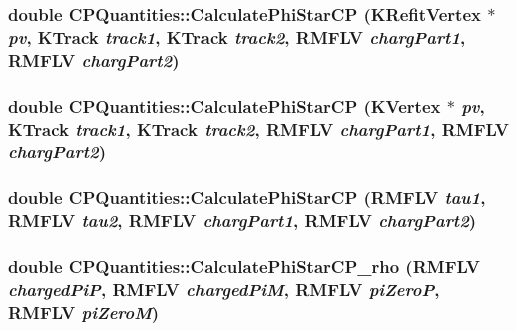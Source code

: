 \hypertarget{classCPQuantities_a42c490c334c7d6e5a0fa5c46319be1fa}{
\subsubsection[{CalculatePhiStarCP}]{\setlength{\rightskip}{0pt plus 5cm}double CPQuantities::CalculatePhiStarCP (KRefitVertex $\ast$ {\em pv}, \/  KTrack {\em track1}, \/  KTrack {\em track2}, \/  RMFLV {\em chargPart1}, \/  RMFLV {\em chargPart2})}}
\label{classCPQuantities_a42c490c334c7d6e5a0fa5c46319be1fa}
\hypertarget{classCPQuantities_a1f725895e37c3c82be878f6e1de13da9}{
\subsubsection[{CalculatePhiStarCP}]{\setlength{\rightskip}{0pt plus 5cm}double CPQuantities::CalculatePhiStarCP (KVertex $\ast$ {\em pv}, \/  KTrack {\em track1}, \/  KTrack {\em track2}, \/  RMFLV {\em chargPart1}, \/  RMFLV {\em chargPart2})}}
\label{classCPQuantities_a1f725895e37c3c82be878f6e1de13da9}
\hypertarget{classCPQuantities_ad58f8cf3eb5bbcd779c16cf55271e263}{
\subsubsection[{CalculatePhiStarCP}]{\setlength{\rightskip}{0pt plus 5cm}double CPQuantities::CalculatePhiStarCP (RMFLV {\em tau1}, \/  RMFLV {\em tau2}, \/  RMFLV {\em chargPart1}, \/  RMFLV {\em chargPart2})}}
\label{classCPQuantities_ad58f8cf3eb5bbcd779c16cf55271e263}
\hypertarget{classCPQuantities_a9c1bb591c0cd39d7811f55ec11e85cf3}{
\subsubsection[{CalculatePhiStarCP\_\-rho}]{\setlength{\rightskip}{0pt plus 5cm}double CPQuantities::CalculatePhiStarCP\_\-rho (RMFLV {\em chargedPiP}, \/  RMFLV {\em chargedPiM}, \/  RMFLV {\em piZeroP}, \/  RMFLV {\em piZeroM})}}
